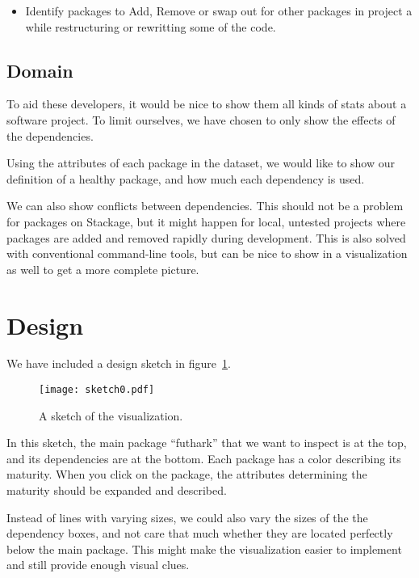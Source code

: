 \documentclass[a4paper,12pt]{article}
\begin{document}
\begin{itemize}
\item Identify packages to Add, Remove or swap out for other packages in project a while restructuring or rewritting some of the code.
\end{itemize}

\subsection{Domain}

To aid these developers, it would be nice to show them all kinds of stats about
a software project.  To limit ourselves, we have chosen to only show the effects
of the dependencies.

Using the attributes of each package in the dataset, we would like to show our
definition of a healthy package, and how much each dependency is used.

We can also show conflicts between dependencies.  This should not be a problem
for packages on Stackage, but it might happen for local, untested projects where
packages are added and removed rapidly during development.  This is also solved
with conventional command-line tools, but can be nice to show in a visualization
as well to get a more complete picture.


\section{Design}

We have included a design sketch in figure~\ref{fig:sketch0}.

\begin{figure}[h!]
\begin{center}
\texttt{[image: sketch0.pdf]}
\caption{A sketch of the visualization.}
\label{fig:sketch0}
\end{center}
\end{figure}

In this sketch, the main package ``futhark'' that we want to inspect is at the
top, and its dependencies are at the bottom.  Each package has a color
describing its maturity.  When you click on the package, the attributes
determining the maturity should be expanded and described.

Instead of lines with varying sizes, we could also vary the sizes of the the
dependency boxes, and not care that much whether they are located perfectly
below the main package.  This might make the visualization easier to implement
and still provide enough visual clues.
\end{document}
